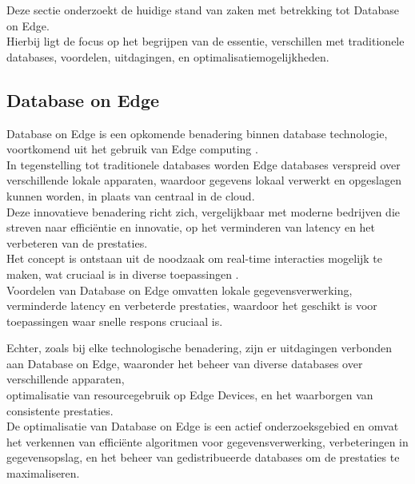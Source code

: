 Deze sectie onderzoekt de huidige stand van zaken met betrekking tot Database on Edge. \\

Hierbij ligt de focus op het begrijpen van de essentie, verschillen met traditionele databases, voordelen, uitdagingen,
 en optimalisatiemogelijkheden.

\subsection{Database on Edge}%
\label{subsec:database_on_edge}

Database on Edge is een opkomende benadering binnen database technologie,
 voortkomend uit het gebruik van Edge computing  \cite{Yang2019EdgeDBAE}.  \\
 
In tegenstelling tot traditionele databases worden Edge databases verspreid over verschillende lokale apparaten,
 waardoor gegevens lokaal verwerkt en opgeslagen kunnen worden, in plaats van centraal in de cloud. \\

Deze innovatieve benadering richt zich, vergelijkbaar met moderne bedrijven die streven naar efficiëntie en innovatie,
 op het verminderen van latency en het verbeteren van de prestaties. \\
 
Het concept is ontstaan uit de noodzaak om real-time interacties mogelijk te maken, wat cruciaal is in diverse toepassingen
\cite{Yang2019EdgeDBAE}. \\

Voordelen van Database on Edge omvatten lokale gegevensverwerking, verminderde latency en verbeterde prestaties,
 waardoor het geschikt is voor toepassingen waar snelle respons cruciaal is.

Echter, zoals bij elke technologische benadering, zijn er uitdagingen verbonden aan Database on Edge,
 waaronder het beheer van diverse databases over verschillende apparaten,
 \\ optimalisatie van resourcegebruik op Edge Devices, en het waarborgen van consistente prestaties. \\

De optimalisatie van Database on Edge is een actief onderzoeksgebied 
 en omvat het verkennen van efficiënte algoritmen voor gegevensverwerking,
  verbeteringen in gegevensopslag, en het beheer van gedistribueerde databases om de prestaties te maximaliseren.

